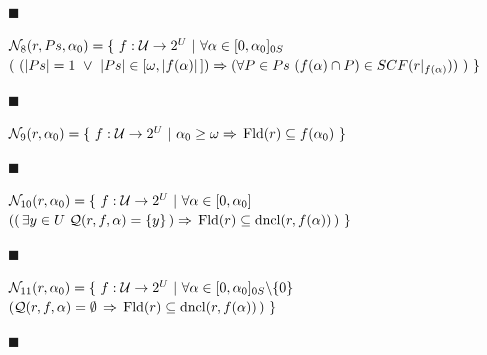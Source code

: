 \documentclass[10pt,a4paper]{amsart}
\begin{document}
 
 
\par\noindent  $\blacksquare$ 
 
$\mathcal{N}_{8}(r,Ps,\alpha_{0})=\{\leavevmode\nobreak\ f:\mathcal{U}\to 2^{U}%
\leavevmode\nobreak\ |\leavevmode\nobreak\ \forall\alpha\in[0,\alpha_{0}]_{0S}%
\leavevmode\nobreak\ $  $(\leavevmode\nobreak\ (|Ps|=1\leavevmode\nobreak\ \vee\leavevmode\nobreak\ |Ps%
|\in[\omega,|f(\alpha)|\,])\Rightarrow(\forall P\in Ps\leavevmode\nobreak\ (f(%
\alpha)\cap P)\in SCF(r|_{f(\alpha)}))\leavevmode\nobreak\ )\leavevmode%
\nobreak\ \}$\par
 
 
 
\par\noindent  $\blacksquare$ 
 
$\mathcal{N}_{9}(r,\alpha_{0})=\{\leavevmode\nobreak\ f:\mathcal{U}\to 2^{U}%
\leavevmode\nobreak\ |\leavevmode\nobreak\ \alpha_{0}\geq\omega\Rightarrow\,%
\mathrm{Fld}(r)\subseteq f(\alpha_{0})\leavevmode\nobreak\ \}$\par
 
 
 
\par\noindent  $\blacksquare$ 
 
$\mathcal{N}_{10}(r,\alpha_{0})=\{\leavevmode\nobreak\ f:\mathcal{U}\to 2^{U}%
\leavevmode\nobreak\ |\leavevmode\nobreak\ \forall\alpha\in[0,\alpha_{0}]$  $((\,\exists y\in U\leavevmode\nobreak\ \mathcal{Q}(r,f,\alpha)=\{y\}\,)%
\Rightarrow\,\mathrm{Fld}(r)\subseteq\mathrm{dncl}(r,f(\alpha))\,)\leavevmode%
\nobreak\ \}$\par
 
 
 
\par\noindent  $\blacksquare$ 
 
$\mathcal{N}_{11}(r,\alpha_{0})=\{\leavevmode\nobreak\ f:\mathcal{U}\to 2^{U}%
\leavevmode\nobreak\ |\leavevmode\nobreak\ \forall\alpha\in[0,\alpha_{0}]_{0S}%
\backslash\{0\}$  $(\mathcal{Q}(r,f,\alpha)=\emptyset\,\Rightarrow\,\mathrm{Fld}(r)\subseteq%
\mathrm{dncl}(r,f(\alpha))\,)\leavevmode\nobreak\ \}$\par
 
 
 
\par\noindent  $\blacksquare$ 
 
\end{document}
